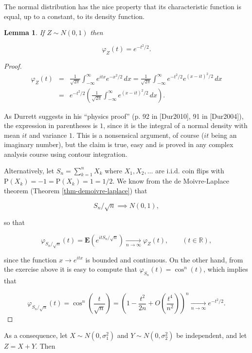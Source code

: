 \documentclass[11pt]{report}
\newcommand{\R}{\mathbb{R}}
\theoremstyle{plain}
\newtheorem{lem}[thm]{Lemma}
\theoremstyle{definition}
\begin{document}
The normal distribution has the nice property that
its characteristic function is equal, up to a
constant, to its density function.

\begin{lem}
If $Z\sim N(0,1)$ then

\[
\varphi_Z(t) = e^{-t^2/2}.
\]

\end{lem}

\begin{proof}

\begin{eqnarray*} \varphi_Z(t) &=& \frac{1}{\sqrt{2\pi}}\int_{-\infty}^\infty e^{itx} e^{-x^2/2}\,dx = \frac{1}{\sqrt{2\pi}}
\int_{-\infty}^\infty e^{-t^2/2} e^{(x-it)^2/2}\,dx \\
&=& e^{-t^2/2} \left( \frac{1}{\sqrt{2\pi}}\int_{-\infty}^\infty  e^{(x-it)^2/2}\,dx \right).
\end{eqnarray*}

As Durrett suggests in his ``physics proof'' (p. 92
in [Dur2010], 91 in [Dur2004]), the expression in
parentheses is $1$, since it is the integral of a
normal density with mean $it$ and variance $1$. This
is a nonsensical argument, of course ($it$ being an
imaginary number), but the claim is true, easy  and is
proved in any complex analysis course using contour
integration.

Alternatively, let $S_n=\sum_{k=1}^n X_k$ where
$X_1,X_2,\ldots$ are i.i.d. coin flips with
$\mathrm{P}(X_k)=-1=\mathrm{P}(X_k)=1=1/2$. We know
from the de Moivre-Laplace theorem (Theorem
\ref{thm-demoivre-laplace}) that

\[
S_n/\sqrt{n} \implies N(0,1),
\]

so that

\[
\varphi_{S_n/\sqrt{n}}(t) = \mathbf{E}\left( e^{it S_n/\sqrt{n}} \right) \xrightarrow[n\to\infty]{} \varphi_Z(t),
\qquad (t\in\R),
\]

since the function $x\to e^{i t x}$ is bounded and
continuous. On the other hand, from the exercise above
it is easy to compute that
$\varphi_{S_n}(t) = \cos^n(t)$, which implies that

\[
\varphi_{S_n/\sqrt{n}}(t) = \cos^n\left(\frac{t}{\sqrt{n}}\right)= \left(1-\frac{t^2}{2n} + O\left(\frac{t^4}{n^2}\right)\right)^n \xrightarrow[n\to\infty]{} e^{-t^2/2}.
\]

\end{proof}

As a consequence, let $X\sim N(0,\sigma_1^2)$ and
$Y\sim N(0,\sigma_2^2)$ be independent, and let
$Z=X+Y$. Then
\end{document}
